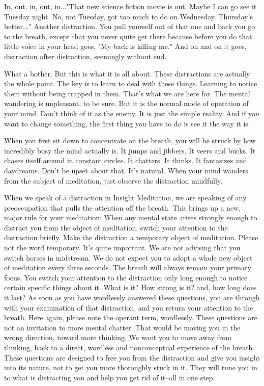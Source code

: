 In, out, in, out, in..."That new science fiction movie is out. Maybe I can go
see it Tuesday night. No, not Tuesday, got too much to do on Wednesday.
Thursday's better..." Another distraction. You pull yourself out of that one and
back you go to the breath, except that you never quite get there because before
you do that little voice in your head goes, "My back is killing me." And on and
on it goes, distraction after distraction, seemingly without end.

What a bother. But this is what it is all about. These distractions are actually
the whole point. The key is to learn to deal with these things. Learning to
notice them without being trapped in them. That's what we are here for. The
mental wandering is unpleasant, to be sure. But it is the normal mode of
operation of your mind. Don't think of it as the enemy. It is just the simple
reality. And if you want to change something, the first thing you have to do is
see it the way it is.

When you first sit down to concentrate on the breath, you will be struck by how
incredibly busy the mind actually is. It jumps and jibbers. It veers and bucks.
It chases itself around in constant circles. It chatters. It thinks. It
fantasizes and daydreams. Don't be upset about that. It's natural. When your
mind wanders from the subject of meditation, just observe the distraction
mindfully.

When we speak of a distraction in Insight Meditation, we are speaking of any
preoccupation that pulls the attention off the breath.
This brings up a new, major rule for your meditation: When any mental state arises strongly enough to distract you from the
object of meditation, switch your attention to the distraction briefly. Make the distraction a temporary object of meditation. Please
not the word temporary. It's quite important. We are not advising that you
switch horses in midstream. We do not expect you to adopt a whole new object of
meditation every three seconds. The breath will always remain your primary
focus. You switch your attention to the distraction only long enough to notice
certain specific things about it. What is it? How strong is it? and, how long
does it last? As soon as you have wordlessly answered these questions, you are
through with your examination of that distraction, and you return your attention
to the breath. Here again, please note the operant term, wordlessly. These
questions are not an invitation to more mental chatter. That would be moving you
in the wrong direction, toward more thinking. We want you to move away from
thinking, back to a direct, wordless and nonconceptual experience of the breath.
These questions are designed to free you from the distraction and give you
insight into its nature, not to get you more thoroughly stuck in it. They will
tune you in to what is distracting you and help you get rid of it--all in one
step.

